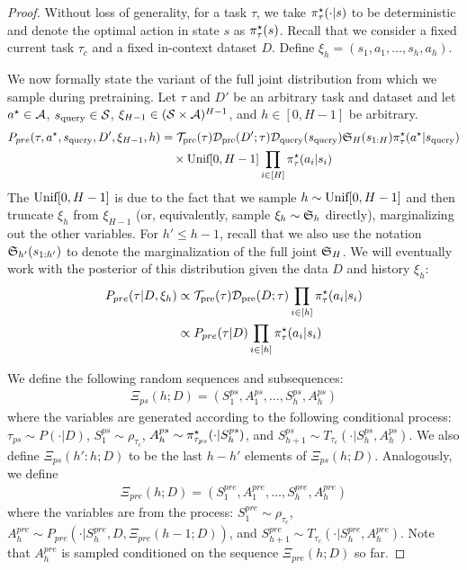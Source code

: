 \begin{proof}
Without loss of generality, for a task $\tau$, we take $\pi^{\star}_\tau(\cdot | s)$ to be deterministic and denote the optimal action in state $s$ as $\pi^{\star}_\tau(s)$. Recall that we consider a fixed current task $\tau_c$ and a fixed in-context dataset $D$. Define $\xi_{h} = (s_1, a_1, \ldots, s_{h}, a_{h})$.

We now formally state the variant of the full joint distribution from which we sample during pretraining. Let $\tau$ and $D'$ be an arbitrary task and dataset and let $a^\star \in \mathcal{A}$, $s_{\text{query}} \in {\mathcal{S}}$, $\xi_{H - 1} \in ({\mathcal{S}} \times \mathcal{A})^{H-1}$, and $h \in [0, H- 1]$ be arbitrary.
\begin{align}
    P_{pre} (\tau, a^\star, s_{\text{query}}, D', \xi_{H - 1}, h) & =  {\mathcal{T}}_{\text{pre}}(\tau) \mathcal{D}_{\text{pre}}(D'; \tau) \mathcal{D}_{\text{query}}(s_{\text{query}})  {\mathfrak{S}}_H(s_{1:H}) \pi^{\star}_\tau(a^\star |s_{\text{query}})  \\
    & \quad \times \text{Unif}{[0, H - 1]} \prod_{i \in [H]} \pi^{\star}_\tau( a_i | s_i)
\end{align}
The $\text{Unif}[0, H - 1]$ is due to the fact that we sample $h \sim \text{Unif}[0, H 
    - 1]$ and then truncate $\xi_h$ from $\xi_{H-1}$ (or, equivalently, sample $\xi_h \sim {\mathfrak{S}}_h$ directly), marginalizing out the other variables.
For $h' \leq h - 1$, recall that we also use the notation ${\mathfrak{S}}_{h'}(s_{1:h'})$ to denote the marginalization of the full joint ${\mathfrak{S}}_H$. We will eventually work with the posterior of this distribution given the data $D$ and history $\xi_h$:
\begin{align}
    P_{pre}(\tau | D, \xi_h) & \propto {\mathcal{T}}_{\text{pre}}(\tau) \mathcal{D}_{\text{pre}}(D; \tau) \prod_{i \in [h]} \pi^{\star}_{\tau}(a_i | s_i) \\
    & \propto P_{pre} (\tau | D) \prod_{i \in [h]} \pi^{\star}_{\tau}(a_i | s_i) 
\end{align}


We define the following random sequences and subsequences:
\begin{align}
    \Xi_{ps}(h; D) =  \left(S_1^{ps}, A_1^{ps}, \ldots, S_h^{ps}, A_h^{ps}\right) 
\end{align}
where the variables are generated according to the following conditional process:  $\tau_{ps} \sim P(\cdot | D)$, $S^{ps}_1 \sim \rho_{\tau_c}$, $A^{ps}_h \sim \pi^{\star}_{\tau_{ps}}(\cdot | S^{ps}_h)$, and $S_{h + 1}^{ps} \sim T_{\tau_c} (\cdot  | S_{h}^{ps}, A^{ps}_{h}) $. We also define $\Xi_{ps}(h': h; D)$ to be the last $h - h'$ elements of $\Xi_{ps}(h; D)$. Analogously, we define
\begin{align}
    \Xi_{pre}(h; D) =  \left(S_1^{pre}, A_1^{pre}, \ldots, S_h^{pre}, A_h^{pre}\right)
\end{align}
where the variables are from the process: $S_1^{pre} \sim \rho_{\tau_c}$, $A_h^{pre} \sim P_{pre} (\cdot | S_h^{pre}, D, \Xi_{pre}(h - 1; D))$, and $S_{h + 1}^{pre} \sim T_{\tau_c}(\cdot | S_h^{pre}, A_h^{pre})$. Note that $A_h^{pre}$ is sampled conditioned on the sequence $\Xi_{pre}(h; D)$ so far. 


\end{proof}
